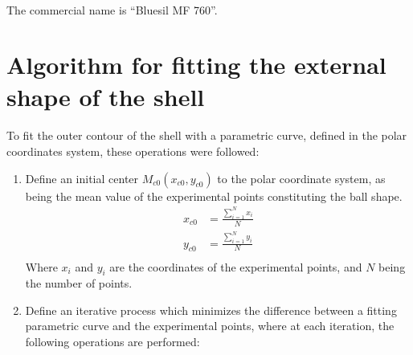 \paragraph{}
The commercial name is "`Bluesil MF 760"'.


\section{Algorithm for fitting the external shape of the shell}
\paragraph{}
To fit the outer contour of the shell with a parametric curve, defined in the polar coordinates system, these operations were followed:
\begin{enumerate}
	\item Define an initial center 	$M_{c0} (x_{c0},y_{c0})$	to the polar coordinate system, as being the mean value of the experimental points constituting the ball shape.
	\begin{align*}
			x_{c0} &= \frac{\sum\limits_{i=1}^N x_i}{N} \\
			y_{c0} &= \frac{\sum\limits_{i=1}^N y_i}{N} \\
	\end{align*}
	Where $x_i$ and $y_i$	are the coordinates of the experimental points, and	$N$	being the number of points.
	\item Define an iterative process which minimizes the difference between a fitting parametric curve and the experimental points, where at each iteration, the 		following operations are performed: 
	

\end{enumerate}

